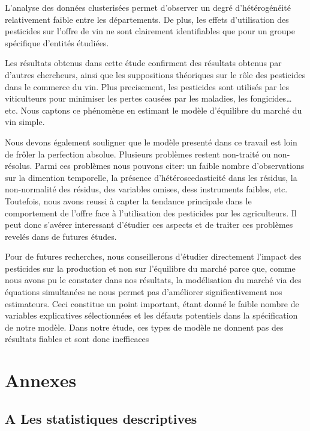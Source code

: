 \documentclass[11pt,]{article}
\begin{document}
L'analyse des données clusterisées permet d'observer un degré
d'hétérogénéité relativement faible entre les départements. De plus, les
effets d'utilisation des pesticides sur l'offre de vin ne sont
clairement identifiables que pour un groupe spécifique d'entités
étudiées.

Les résultats obtenus dans cette étude confirment des résultats obtenus
par d'autres chercheurs, ainsi que les suppositions théoriques sur le
rôle des pesticides dans le commerce du vin. Plus precisement, les
pesticides sont utilisés par les viticulteurs pour minimiser les pertes
causées par les maladies, les fongicides\ldots{} etc. Nous captons ce
phénomène en estimant le modèle d'équilibre du marché du vin simple.

Nous devons également souligner que le modèle presenté dans ce travail
est loin de frôler la perfection absolue. Plusieurs problèmes restent
non-traité ou non-résolus. Parmi ces problèmes nous pouvons citer: un
faible nombre d'observations sur la dimention temporelle, la présence
d'hétéroscedasticité dans les résidus, la non-normalité des résidus, des
variables omises, dess instruments faibles, etc. Toutefois, nous avons
reussi à capter la tendance principale dans le comportement de l'offre
face à l'utilisation des pesticides par les agriculteurs. Il peut donc
s'avérer interessant d'étudier ces aspects et de traiter ces problèmes
revelés dans de futures études.

Pour de futures recherches, nous conseillerons d'étudier directement
l'impact des pesticides sur la production et non sur l'équilibre du
marché parce que, comme nous avons pu le constater dans nos résultats,
la modélisation du marché via des équations simultanées ne nous permet
pas d'améliorer significativement nos estimateurs. Ceci constitue un
point important, étant donné le faible nombre de variables explicatives
sélectionnées et les défauts potentiels dans la spécification de notre
modèle. Dans notre étude, ces types de modèle ne donnent pas des
résultats fiables et sont donc inefficaces

\newpage

\hypertarget{annexes}{%
\section{Annexes}\label{annexes}}

\hypertarget{a-les-statistiques-descriptives}{%
\subsection{A Les statistiques
descriptives}\label{a-les-statistiques-descriptives}}
\end{document}

